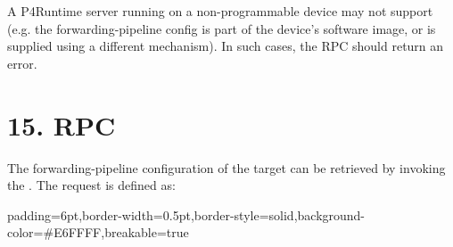 \documentclass[11pt]{article}
\begin{document}
{%
A P4Runtime server running on a non-programmable device may not
support  (e.g. the forwarding-pipeline
config is part of the device's software image, or is supplied using a
different mechanism). In such cases, the RPC should return an
 error.%

\section{15.\hspace*{0.5em} RPC}\label{sec-getforwardingpipelineconfig-rpc}%

\noindent{}The forwarding-pipeline configuration of the target can be retrieved by invoking
the . The request is defined as:%

\begin{mdbmargintb}{6pt}{6pt}%
\begin{mdblock}{padding=6pt,border-width=0.5pt,border-style=solid,background-color=\#E6FFFF,breakable=true}%
\begin{mdpre}%
\end{mdpre}%
\end{mdblock}%
\end{mdbmargintb}%

}
\end{document}
